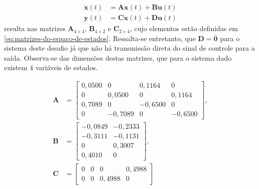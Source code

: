 \begin{subequations}
    \label{eq:espaco-de-estados-continuo}
    \begin{align}
        \mathbf{\dot{x}}(t) & = \mathbf{A}\mathbf{x}(t) + \mathbf{B}\mathbf{u}(t)
        \label{eq:derivada-do-vetor-de-estados}                                   \\
        \mathbf{y}(t)       & = \mathbf{C}\mathbf{x}(t) + \mathbf{D}\mathbf{u}(t)
        \label{eq:saida-do-sistema-em-espaco-de-estados}
    \end{align}
\end{subequations} resulta nas matrizes $\mathbf{A}_{4\times 4}$,
$\mathbf{B}_{4\times 2}$ e $\mathbf{C}_{2\times 4}$, cujo elementos estão
definidas em \ref{eq:matrizes-do-espaco-de-estados}. Ressalta-se entretanto, que
$\mathbf{D} = \mathbf{\bar{0}}$ para o sistema deste desafio já que não há
transmissão direta do sinal de controle para a saída. Observa-se das dimensões
destas matrizes, que para o sistema dado existem 4 variáveis de estados.

\begin{subequations}
    \label{eq:matrizes-do-espaco-de-estados}
    \begin{align}
        \mathbf{A} & =
        \begin{bmatrix}
            \label{eq:matriz-a}
            0,0500 & 0       & 0,1164  & 0       \\
            0      & 0,0500  & 0       & 0,1164  \\
            0,7089 & 0       & -0,6500 & 0       \\
            0      & -0,7089 & 0       & -0,6500
        \end{bmatrix},  \\
        \mathbf{B} & =
        \begin{bmatrix}
            \label{eq:matriz-b}
            -0,0849 & -0,2333 \\
            -0,3111 & -0,1131 \\
            0       & 0,3007  \\
            0,4010  & 0
        \end{bmatrix}, \\
        \mathbf{C} & =
        \begin{bmatrix}
            \label{eq:matriz-c}
            0 & 0 & 0      & 0,4988 \\
            0 & 0 & 0,4988 & 0
        \end{bmatrix} 
    \end{align}
\end{subequations}

